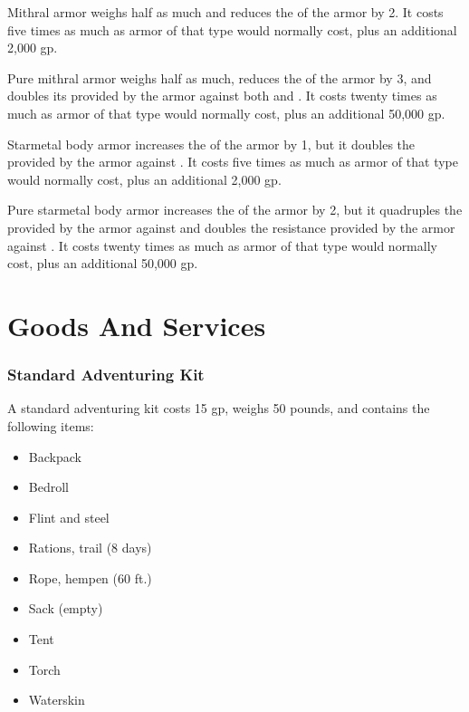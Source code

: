          Mithral armor weighs half as much and reduces the  of the armor by 2.
        It costs five times as much as armor of that type would normally cost, plus an additional 2,000 gp.

         Pure mithral armor weighs half as much, reduces the  of the armor by 3, and doubles its  provided by the armor against both  and .
        It costs twenty times as much as armor of that type would normally cost, plus an additional 50,000 gp.

         Starmetal body armor increases the  of the armor by 1, but it doubles the  provided by the armor against .
        It costs five times as much as armor of that type would normally cost, plus an additional 2,000 gp.

         Pure starmetal body armor increases the  of the armor by 2, but it quadruples the  provided by the armor against  and doubles the resistance provided by the armor against .
        It costs twenty times as much as armor of that type would normally cost, plus an additional 50,000 gp.

\section{Goods And Services}

    \subsubsection{Standard Adventuring Kit}
        A standard adventuring kit costs 15 gp, weighs 50 pounds, and contains the following items:
        \begin{itemize}
            \item Backpack
            \item Bedroll
            \item Flint and steel
            \item Rations, trail (8 days)
            \item Rope, hempen (60 ft.)
            \item Sack (empty)
            \item Tent
            \item Torch
            \item Waterskin
        \end{itemize}

